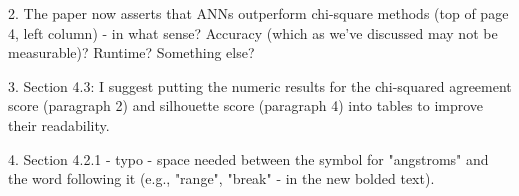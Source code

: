 2. The paper now asserts that ANNs outperform chi-square methods (top of page 4, left column) - in what sense?  Accuracy (which as we've discussed may not be measurable)?  Runtime?  Something else?

3. Section 4.3: I suggest putting the numeric results for the chi-squared agreement score (paragraph 2) and silhouette score (paragraph 4) into tables to improve their readability.

4. Section 4.2.1 - typo - space needed between the symbol for "angstroms" and the word following it (e.g., "range", "break" - in the new bolded text).
 
